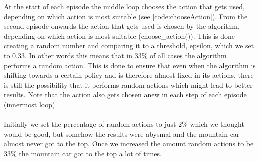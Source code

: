\documentclass{article}
\begin{document}
	\noindent At the start of each episode the middle loop chooses the action that gets used, depending on which action is most suitable (see \autoref{code:chooseAction}). From the second episode onwards the action that gets used is chosen by the algorithm, depending on which action is most suitable (choose\_action()). This is done creating a random number and comparing it to a threshold, epsilon, which we set to $0.33$. In other words this means that in $33\%$ of all cases the algorithm performs a random action. This is done to ensure that even when the algorithm is shifting towards a certain policy and is therefore almost fixed in its actions, there is still the possibility that it performs random actions which might lead to better results. Note that the action also gets chosen anew in each step of each episode (innermost loop). \\
	\\
	Initially we set the percentage of random actions to just $2\%$ which we thought would be good, but somehow the results were abysmal and the mountain car almost never got to the top. Once we increased the amount random actions to be $33\%$ the mountain car got to the top a lot of times. 
	
	
	
	
	
	
	
\end{document}
